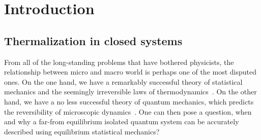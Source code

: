 \chapter{Introduction}
\thispagestyle{chapterBeginStyle}

\section{Thermalization in closed systems}
From all of the long-standing problems that have bothered physicists, the relationship
between micro and macro world is perhaps one of the most disputed ones. On the one
hand, we have a remarkably successful theory of statistical mechanics and the seemingly
irreversible laws of thermodynamics~\autocite{huang1987statistical,feynman1998statistical}.
On the other hand, we have a no less successful theory of quantum mechanics,
which predicts the reversibility of microscopic dynamics~\autocite{landau1991quantum,Sakurai2017}.
One can then pose a question, when and why a far-from equilibrium isolated quantum system
can be accurately described using equilibrium statistical mechanics?

